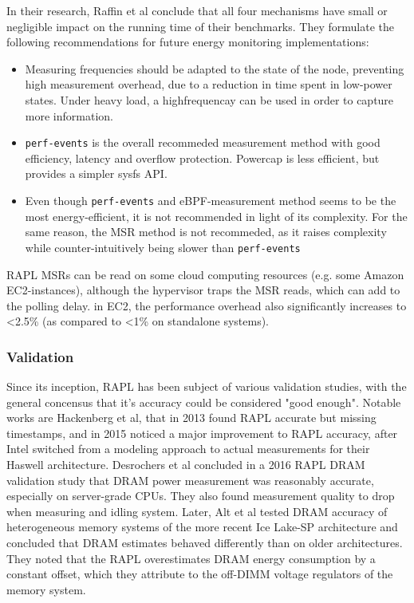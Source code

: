 In their research, Raffin et al conclude that all four mechanisms have small or negligible impact on the running time of their benchmarks. They formulate the following recommendations for future energy monitoring implementations:
\begin{itemize}
    \item Measuring frequencies should be adapted to the state of the node, preventing high measurement overhead, due to a reduction in time spent in low-power states. Under heavy load, a highfrequencay can be used in order to capture more information.
    \item \texttt{perf-events} is the overall recommeded measurement method with good efficiency, latency and overflow protection. Powercap is less efficient, but provides a simpler sysfs API.
    \item Even though \texttt{perf-events} and eBPF-measurement method seems to be the most energy-efficient, it is not recommended in light of its complexity. For the same reason, the MSR method is not recommeded, as it raises complexity while counter-intuitively being slower than \texttt{perf-events}
\end{itemize}

RAPL MSRs can be read on some cloud computing resources (e.g. some Amazon EC2-instances), although the hypervisor traps the MSR reads, which can add to the polling delay. in EC2, the performance overhead also significantly increases to <2.5\% (as compared to <1\% on standalone systems)\parencite{jay2023experimental}.

\subsubsection{Validation}
\label{sec:raplvalidation}
Since its inception, RAPL has been subject of various validation studies, with the general concensus that it's accuracy could be considered "good enough"\parencite{raffin2024dissecting}. Notable works are Hackenberg et al, that in 2013 found RAPL accurate but missing timestamps\parencite{hackenberg2013power}, and in 2015 noticed a major improvement to RAPL accuracy, after Intel switched from a modeling approach to actual measurements for their Haswell architecture\parencite{hackenberg2015energy}. Desrochers et al concluded in a 2016 RAPL DRAM validation study\parencite{desrochers2016validation} that DRAM power measurement was reasonably accurate, especially on server-grade CPUs. They also found measurement quality to drop when measuring and idling system. Later, Alt et al\parencite{alt2024experimental} tested DRAM accuracy of heterogeneous memory systems of the more recent Ice Lake-SP architecture and concluded that DRAM estimates behaved differently than on older architectures. They noted that the RAPL overestimates DRAM energy consumption by a constant offset, which they attribute to the off-DIMM voltage regulators of the memory system.


